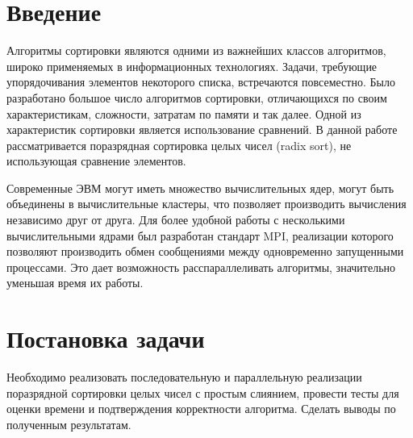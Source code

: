 \documentclass{report}
\begin{document}
	\setcounter{page}{2}
	
	\tableofcontents
	\newpage
	
	\section*{Введение}
	Алгоритмы сортировки являются одними из важнейших классов алгоритмов, широко применяемых в информационных технологиях. Задачи, требующие упорядочивания элементов некоторого списка, встречаются повсеместно. Было разработано большое число алгоритмов сортировки, отличающихся по своим характеристикам, сложности, затратам по памяти и так далее. Одной из характеристик сортировки является использование сравнений. В данной работе рассматривается поразрядная сортировка целых чисел (radix sort), не использующая сравнение элементов.
	\par Современные ЭВМ могут иметь множество вычислительных ядер, могут быть объединены в вычислительные кластеры, что позволяет производить вычисления независимо друг от друга. Для более удобной работы с несколькими вычислительными ядрами был разработан стандарт MPI, реализации которого позволяют производить обмен сообщениями между одновременно запущенными процессами. Это дает возможность расспараллеливать алгоритмы, значительно уменьшая время их работы.
	\newpage
	
	\section*{Постановка задачи}
	Необходимо реализовать последовательную и параллельную реализации поразрядной сортировки целых чисел с простым слиянием, провести тесты для оценки времени и подтверждения корректности алгоритма. Сделать выводы по полученным результатам.
	\newpage
	
\end{document}
